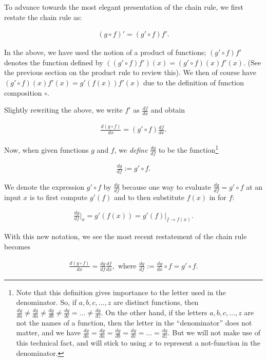 \documentclass{article}
\begin{document}
To advance towards the most elegant presentation of the chain rule, we first restate the chain rule as:

\begin{align*}
    (g \circ f)' = (g' \circ f) f'.
\end{align*}

In the above, we have used the notion of a product of functions; $(g' \circ f)f'$ denotes the function defined by $((g' \circ f)f')(x) = (g' \circ f)(x)f'(x)$. (See the previous section on the product rule to review this). We then of course have $(g' \circ f)(x)f'(x) = g'(f(x))f'(x)$ due to the definition of function composition $\circ$.

Slightly rewriting the above, we write $f'$ as $\frac{df}{dx}$ and obtain

\begin{align*}
    \frac{d(g \circ f)}{dx} = (g' \circ f)\frac{df}{dx}.
\end{align*}

Now, when given functions $g$ and $f$, we \textit{define} $\frac{dg}{df}$ to be the function\footnote{Note that this definition gives importance to the letter used in the denominator. So, if $a, b, c, ..., z$ are distinct functions, then $\frac{dg}{da} \neq \frac{dg}{da} \neq \frac{dg}{db} \neq \frac{dg}{dc} = ... \neq \frac{dg}{dz}$. On the other hand, if the letters $a, b, c, ..., z$ are not the names of a function, then the letter in the ``denominator'' does not matter, and we have $\frac{dg}{da} = \frac{dg}{da} = \frac{dg}{db} = \frac{dg}{dc} = ... = \frac{dg}{dz}$. But we will not make use of this technical fact, and will stick to using $x$ to represent a not-function in the denominator.}

\begin{align*}
    \frac{dg}{df} := g' \circ f.
\end{align*}

We denote the expression $g' \circ f$ by $\frac{dg}{df}$ because one way to evaluate $\frac{dg}{df} = g' \circ f$ at an input $x$ is to first compute $g'(f)$ and to then substitute $f(x)$ in for $f$:

\begin{align*}
    \frac{dg}{df}\Big|_x = g'(f(x)) = g'(f)|_{f \rightarrow f(x)}. 
\end{align*}

With this new notation, we see the most recent restatement of the chain rule becomes

\begin{align*}
    \frac{d (g \circ f)}{dx} = \frac{dg}{df} \frac{df}{dx}, \text{ where $\frac{dg}{df} := \frac{dg}{dx} \circ f = g' \circ f$}.
\end{align*}
\end{document}
